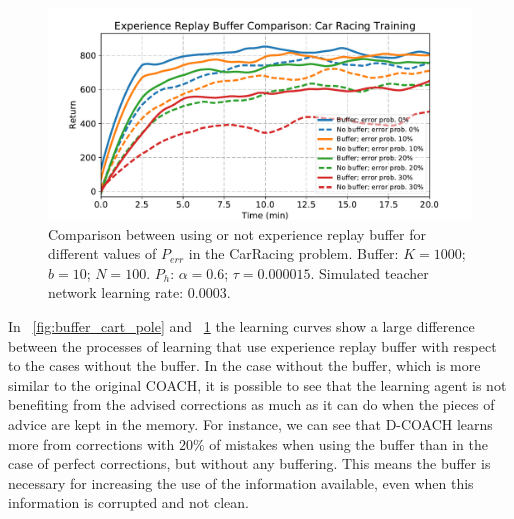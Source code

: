 \begin{figure}[t]
    \centering
    \vspace{-0.2cm}
    \includegraphics[width=0.9\linewidth]{imagenes/cap3/bufferCarRacing.pdf}
    \vspace{-0.2cm}
    \caption{Comparison between using or not experience replay buffer for different values of $P_\mathit{err}$ in the CarRacing problem. Buffer: $K = 1000$; $b = 10$; $N = 100$. $P_{h}$: $\alpha = 0.6$; $\tau = 0.000015$. Simulated teacher network learning rate: $0.0003$.}
    \label{fig:buffer_car_racing}
\end{figure}

In \figurename~{\ref{fig:buffer_cart_pole}} and \figurename~{\ref{fig:buffer_car_racing}} the learning curves show a large difference between the processes of learning that use experience replay buffer with respect to the cases without the buffer. In the case without the buffer, which is more similar to the original COACH, it is possible to see that the learning agent is not benefiting from the advised corrections as much as it can do when the pieces of advice are kept in the memory. For instance, we can see that D-COACH learns more from corrections with $20 \%$ of mistakes when using the buffer than in the case of perfect corrections, but without any buffering. This means the buffer is necessary for increasing the use of the information available, even when this information is corrupted and not clean.

